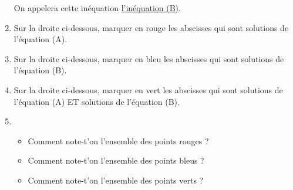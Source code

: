 \documentclass[
	classe=$2^{de}$,
	headerTitle=Chapitre\space 2
]{exercice}
\begin{document}
\begin{enumerate}
	      On appelera cette inéquation \uline{l'inéquation (B)}.
	\item Sur la droite ci-dessous, marquer en {\color{red}rouge} les abscisses qui sont solutions de l'équation (A).
	      \begin{center}
	      \end{center}
	\item Sur la droite ci-dessous, marquer en {\color{blue}bleu} les abscisses qui sont solutions de l'équation (B).
	      \begin{center}
	      \end{center}
	\item Sur la droite ci-dessous, marquer en {\color{green}vert} les abscisses qui sont solutions de l'équation (A) ET solutions de l'équation (B).
	      \begin{center}
	      \end{center}
	\item
	      \begin{itemize}
		      \item Comment note-t'on l'ensemble des points {\color{red}rouges} ? \correctionDots{$[-∞ ; 1]$}
		      \item  Comment note-t'on l'ensemble des points {\color{blue}bleus} ? \correctionDots{$[-2 ; +∞]$}
		      \item  Comment note-t'on l'ensemble des points {\color{green}verts} ? \correctionDots{$[-2 ; 1]$}
	      \end{itemize}
\end{enumerate}
\end{document}
